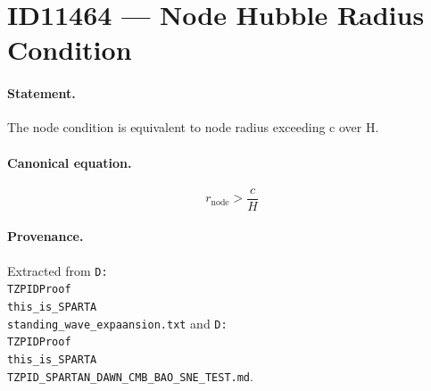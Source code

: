 \section*{ID11464 --- Node Hubble Radius Condition}

\paragraph{Statement.}
The node condition is equivalent to node radius exceeding c over H.

\paragraph{Canonical equation.}
\[
r_{\mathrm{node}}>\frac{c}{H}
\]

\paragraph{Provenance.}
Extracted from \texttt{D:\\TZPIDProof\\this\_is\_SPARTA\\standing\_wave\_expaansion.txt} and \texttt{D:\\TZPIDProof\\this\_is\_SPARTA\\TZPID\_SPARTAN\_DAWN\_CMB\_BAO\_SNE\_TEST.md}.
